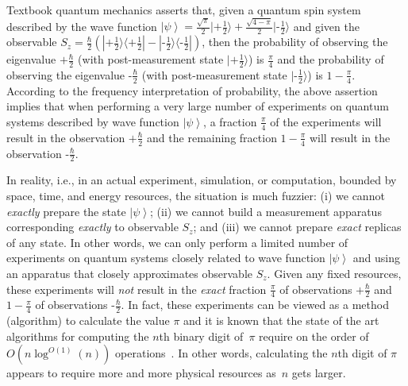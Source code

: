 \documentclass[reprint, aps, prl,superscriptaddress, showpacs,
showkeys]{revtex4-1}
\theoremstyle{plain}
\theoremstyle{definition}
\newcommand{\ket}[1]{{\left\vert{#1}\right\rangle}}
\newcommand{\fket}[1]{{|#1\rangle}}
\newcommand{\fproj}[1]{|#1\rangle\langle #1|}
\newcommand{\ps}{\texttt{+}}
\newcommand{\minus}{\texttt{-}}
\begin{document}
\maketitle

Textbook quantum mechanics asserts that, given a quantum spin system
described by the wave function
$\ket{\psi}=\frac{\sqrt{\pi}}{2}\fket{\ps\frac{1}{2}}+\frac{\sqrt{4-\pi}}{2}\fket{\minus\frac{1}{2}}$
and given the observable
$S_z =
\frac{\hbar}{2}(\fproj{\ps\frac{1}{2}}-\fproj{\minus\frac{1}{2}})$,
then the probability of observing the eigenvalue $\ps\frac{\hbar}{2}$
(with post-measurement state $\fket{\ps\frac{1}{2}}$) is
$\frac{\pi}{4}$ and the probability of observing the eigenvalue
$\minus\frac{\hbar}{2}$ (with post-measurement state
$\fket{\minus\frac{1}{2}}$) is $1-\frac{\pi}{4}$. According to the
frequency interpretation of probability, the above assertion implies
that when performing a very large number of experiments on quantum
systems described by wave function $\ket{\psi}$, a fraction
$\frac{\pi}{4}$ of the experiments will result in the observation
$\ps\frac{\hbar}{2}$ and the remaining fraction $1-\frac{\pi}{4}$ will
result in the observation $\minus\frac{\hbar}{2}$.

In reality, i.e., in an actual experiment, simulation, or computation,
bounded by space, time, and energy resources, the situation is much
fuzzier: (i) we cannot \emph{exactly} prepare the state $\ket{\psi}$;
(ii) we cannot build a measurement apparatus corresponding
\emph{exactly} to observable $S_z$; and (iii) we cannot prepare
\emph{exact} replicas of any state. In other words, we can only
perform a limited number of experiments on quantum systems closely
related to wave function $\ket{\psi}$ and using an apparatus that
closely approximates observable $S_z$. Given any fixed resources,
these experiments will \emph{not} result in the \emph{exact} fraction
$\frac{\pi}{4}$ of observations $\ps\frac{\hbar}{2}$ and
$1-\frac{\pi}{4}$ of observations $\minus\frac{\hbar}{2}$. In fact,
these experiments can be viewed as a method (algorithm) to calculate
the value $\pi$ and it is known that the state of the art algorithms
for computing the $n$th binary digit of~$\pi$ require on the order of
$O\left(n\log^{O\left(1\right)}\left(n\right)\right)$
operations~\cite{journals/moc/BaileyBP97}. In other words, calculating
the $n$th digit of $\pi$ appears to require more and more physical
resources as~$n$ gets larger.
\end{document}
